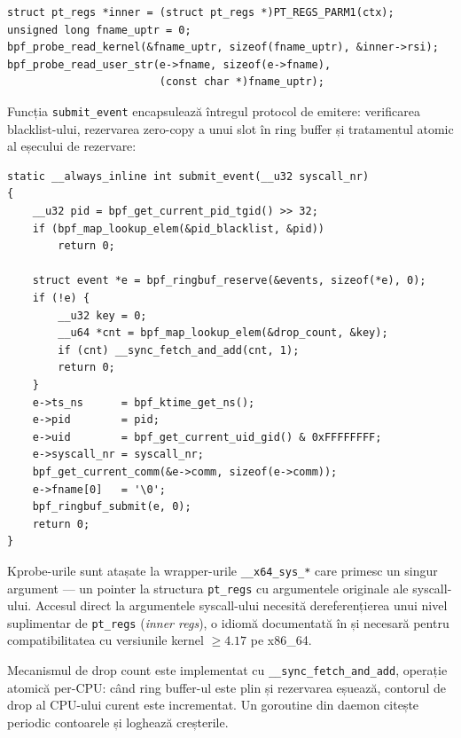 \begin{verbatim}
struct pt_regs *inner = (struct pt_regs *)PT_REGS_PARM1(ctx);
unsigned long fname_uptr = 0;
bpf_probe_read_kernel(&fname_uptr, sizeof(fname_uptr), &inner->rsi);
bpf_probe_read_user_str(e->fname, sizeof(e->fname),
                        (const char *)fname_uptr);
\end{verbatim}

\par Funcția \texttt{submit\_event} encapsulează întregul protocol de emitere: verificarea blacklist-ului, rezervarea zero-copy a unui slot în ring buffer și tratamentul atomic al eșecului de rezervare:

\begin{lstlisting}[style=cstyle,caption={Funcția \texttt{submit\_event}: rezervare ring buffer și contorizare drop-uri}]
static __always_inline int submit_event(__u32 syscall_nr)
{
    __u32 pid = bpf_get_current_pid_tgid() >> 32;
    if (bpf_map_lookup_elem(&pid_blacklist, &pid))
        return 0;

    struct event *e = bpf_ringbuf_reserve(&events, sizeof(*e), 0);
    if (!e) {
        __u32 key = 0;
        __u64 *cnt = bpf_map_lookup_elem(&drop_count, &key);
        if (cnt) __sync_fetch_and_add(cnt, 1);
        return 0;
    }
    e->ts_ns      = bpf_ktime_get_ns();
    e->pid        = pid;
    e->uid        = bpf_get_current_uid_gid() & 0xFFFFFFFF;
    e->syscall_nr = syscall_nr;
    bpf_get_current_comm(&e->comm, sizeof(e->comm));
    e->fname[0]   = '\0';
    bpf_ringbuf_submit(e, 0);
    return 0;
}
\end{lstlisting}

\par Kprobe-urile sunt atașate la wrapper-urile \texttt{\_\_x64\_sys\_*} care primesc un singur argument --- un pointer la structura \texttt{pt\_regs} cu argumentele originale ale syscall-ului. Accesul direct la argumentele syscall-ului necesită dereferențierea unui nivel suplimentar de \texttt{pt\_regs} (\textit{inner regs}), o idiomă documentată în \cite{Rice2023} și necesară pentru compatibilitatea cu versiunile kernel $\geq 4.17$ pe x86\_64.

\par Mecanismul de drop count este implementat cu \texttt{\_\_sync\_fetch\_and\_add}, operație atomică per-CPU: când ring buffer-ul este plin și rezervarea eșuează, contorul de drop al CPU-ului curent este incrementat. Un goroutine din daemon citește periodic contoarele și loghează creșterile.


